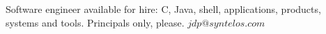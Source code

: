 

Software engineer available for hire: C, Java, shell, applications,
products, systems and tools.  Principals only, please.
$jdp@syntelos.com$

\bye
